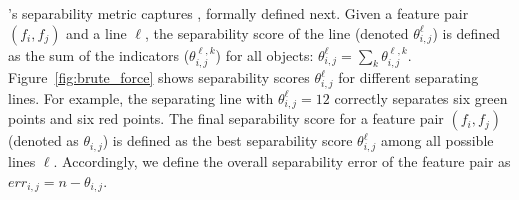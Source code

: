 



\genviz's separability metric captures , formally defined next.
Given a feature pair $(f_i, f_j)$ and a line $\ell$, the separability score of the line (denoted $\theta_{i, j}^\ell$) is defined as the sum of the indicators ($\theta_{i,j}^{\ell,k}$) for all objects: $\theta_{i,j}^{\ell}= \sum_{k}{\theta_{i,j}^{\ell,k}}$.
\noindent Figure~\ref{fig:brute_force} shows separability scores $\theta_{i, j}^\ell$ for different separating lines. For example, the separating line with $\theta_{i, j}^\ell=12$ correctly separates six green points and six red points. The final separability score for a feature pair $(f_i,f_j)$ (denoted as $\theta_{i, j}$) is defined as the best separability score $\theta_{i, j}^{\ell}$ among all possible lines $\ell$. Accordingly, we define the overall separability error of the feature pair as $err_{i,j}=n-\theta_{i, j}$.

